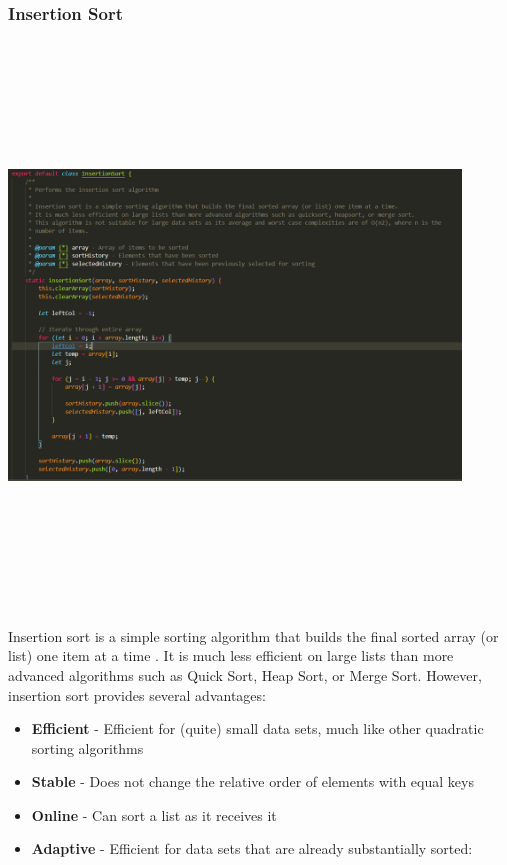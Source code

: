 \subsubsection{Insertion Sort}
\begin{center}
    \includegraphics[width=12cm,height=15cm,keepaspectratio]{images/insertionsort}
\end{center}
Insertion sort is a simple sorting algorithm that builds the final sorted array (or list) one item at a time \cite{insertion_sort}. It is much less efficient on large lists than more advanced algorithms such as Quick Sort, Heap Sort, or Merge Sort. However, insertion sort provides several advantages:

\begin{itemize}
    \item \textbf{Efficient} - Efficient for (quite) small data sets, much like other quadratic sorting algorithms
    \item \textbf{Stable} - Does not change the relative order of elements with equal keys
    \item \textbf{Online} - Can sort a list as it receives it
    \item \textbf{Adaptive} - Efficient for data sets that are already substantially sorted:
\end{itemize}

